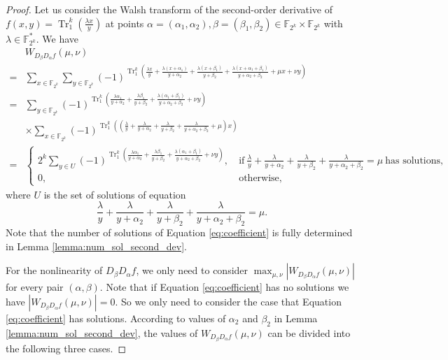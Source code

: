 \documentclass{article}
\newcommand{\F}{\mathbb{F}}
\newcommand{\0}{\textbf{0}}
\newcommand{\1}{\textbf{1}}
\newcommand{\TRACE}{\operatorname{Tr}_1^k}
\theoremstyle{plain}
\begin{document}
    \begin{proof}
        Let us consider the Walsh transform of the second-order derivative of $f(x,y)=\TRACE\left(\frac{\lambda x}{y}\right)$ at  
        points $\alpha=(\alpha_1,\alpha_2),\beta=(\beta_1,\beta_2)\in\F_{2^k}\times\F_{2^k}$ with $\lambda\in\F_{2^k}^*$.
        We have
        \begin{align*}\label{eq:secondordersum}
            &W_{D_{\beta}D_{\alpha}f}(\mu,\nu)\nonumber\\
            =&\sum_{x\in\F_{2^k}}\sum_{y\in\F_{2^k}}(-1)^{\TRACE\left(\frac{\lambda x}{y}+\frac{\lambda (x+\alpha_1)}{y+\alpha_2}+\frac{\lambda (x+\beta_1)}{y+\beta_2}+\frac{\lambda (x+\alpha_1+\beta_1)}{y+\alpha_2+\beta_2}+\mu x+\nu y\right)}\nonumber\\
            =&\sum_{y\in\F_{2^k}}(-1)^{\TRACE\left(\frac{\lambda\alpha_1}{y+\alpha_2}+\frac{\lambda\beta_1}{y+\beta_2}+\frac{\lambda(\alpha_1+\beta_1)}{y+\alpha_2+\beta_2}+\nu y\right)}\nonumber\\
            &\times \sum_{x\in\F_{2^k}}(-1)^{\TRACE\left(\left(\frac{\lambda}{y}+\frac{\lambda}{y+\alpha_2}+\frac{\lambda}{y+\beta_2}+\frac{\lambda}{y+\alpha_2+\beta_2}+\mu\right)x\right)}\nonumber\\
            =&\begin{cases}
                2^k\sum_{y\in U}(-1)^{\TRACE\left(\frac{\lambda\alpha_1}{y+\alpha_2}+\frac{\lambda\beta_1}{y+\beta_2}+\frac{\lambda(\alpha_1+\beta_1)}{y+\alpha_2+\beta_2}+\nu y\right)},&~\text{if}~\frac{\lambda}{y}+\frac{\lambda}{y+\alpha_2}+\frac{\lambda}{y+\beta_2}+\frac{\lambda}{y+\alpha_2+\beta_2}=\mu~\text{has solutions},\\
                0, &~\text{otherwise},
            \end{cases}
        \end{align*}
        where $U$ is the set of solutions of equation
        \begin{equation}\label{eq:coefficient}
            \frac{\lambda}{y}+\frac{\lambda}{y+\alpha_2}+\frac{\lambda}{y+\beta_2}+\frac{\lambda}{y+\alpha_2+\beta_2}=\mu.
        \end{equation}
        Note that the number of solutions of Equation \eqref{eq:coefficient} is fully determined in Lemma \ref{lemma:num_sol_second_dev}. 

        For the nonlinearity of $D_{\beta}D_{\alpha}f$, we only need to consider $\max_{\mu,\nu}|W_{D_{\beta}D_{\alpha}f}(\mu,\nu)|$ for every pair $(\alpha,\beta)$.
        Note that if Equation \eqref{eq:coefficient} has no solutions we have $\left\lvert W_{D_{\beta}D_{\alpha}f}(\mu,\nu)\right\rvert=0$.
        So we only need to consider the case that Equation \eqref{eq:coefficient} has solutions.
        According to values of $\alpha_2$ and $\beta_2$ in Lemma \ref{lemma:num_sol_second_dev}, the values of $W_{D_{\beta}D_{\alpha}f}(\mu,\nu)$
        can be divided into the following three cases.


\end{proof}
\end{document}
